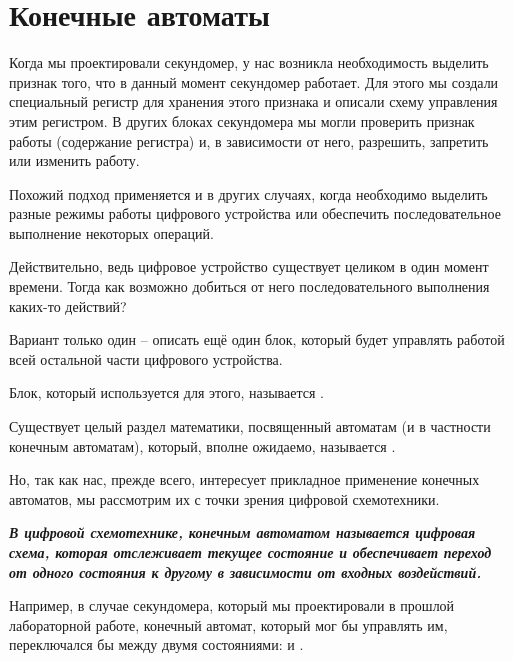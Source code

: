 \chapter{Конечные автоматы} 

\par{Когда мы проектировали секундомер, у нас возникла необходимость выделить признак того, что в данный момент секундомер работает. Для этого мы создали специальный регистр для хранения этого признака и описали схему управления этим регистром. В других блоках секундомера мы могли проверить признак работы (содержание регистра) и, в зависимости от него, разрешить, запретить или изменить работу.}

\par{Похожий подход применяется и в других случаях, когда необходимо выделить разные режимы работы цифрового устройства или обеспечить последовательное выполнение некоторых операций.}

\par{Действительно, ведь цифровое устройство существует целиком в один момент времени. Тогда как возможно добиться от него последовательного выполнения каких-то действий?}

\par{Вариант только один – описать ещё один блок, который будет управлять работой всей остальной части цифрового устройства.}

\par{Блок, который используется для этого, называется .}

\par{Существует целый раздел математики, посвященный автоматам (и в частности конечным автоматам), который, вполне ожидаемо, называется .}

\par{Но, так как нас, прежде всего, интересует прикладное применение конечных автоматов, мы рассмотрим их с точки зрения цифровой схемотехники.}

\par{\textbf{\textit{В цифровой схемотехнике, конечным автоматом называется цифровая схема, которая отслеживает текущее состояние и обеспечивает переход от одного состояния к другому в зависимости от входных воздействий.}}}

\par{Например, в случае секундомера, который мы проектировали в прошлой лабораторной работе, конечный автомат, который мог бы управлять им, переключался бы между двумя состояниями:  и .}

